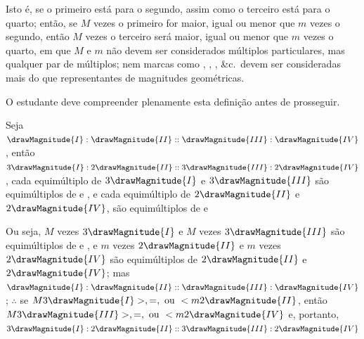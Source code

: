 \documentclass[booklanguage=brazilian]{byrnebook}
\begin{document}
Isto é, se o primeiro está para o segundo, assim como o terceiro está para o quarto; então, se $M$ vezes o primeiro for maior, igual ou menor que $m$ vezes o segundo, então $M$ vezes o terceiro será maior, igual ou menor que $m$ vezes o quarto, em que $M$ e $m$ não devem ser considerados múltiplos particulares, mas qualquer par de múltiplos; nem marcas como , , , \&c.\ devem ser consideradas mais do que representantes de magnitudes geométricas.

O estudante deve compreender plenamente esta definição antes de prosseguir.

\vfill\pagebreak

\label{prop:V.IV}

Seja $\drawMagnitude{I} : \drawMagnitude{II} :: \drawMagnitude{III} : \drawMagnitude{IV}$, então $3\drawMagnitude{I} : 2\drawMagnitude{II} :: 3\drawMagnitude{III} : 2\drawMagnitude{IV}$, cada equimúltiplo de $3\drawMagnitude{I}$ e $3\drawMagnitude{III}$ são equimúltiplos de  e , e cada equimúltiplo de $2\drawMagnitude{II}$ e $2\drawMagnitude{IV}$, são equimúltiplos de  e  

Ou seja, $M$ vezes $3\drawMagnitude{I}$ e $M$ vezes $3\drawMagnitude{III}$ são equimúltiplos de  e , e $m$ vezes $2\drawMagnitude{II}$ e $m$ vezes $2\drawMagnitude{IV}$ são equimúltiplos de $2\drawMagnitude{II}$ e $2\drawMagnitude{IV}$; mas $\drawMagnitude{I} : \drawMagnitude{II} :: \drawMagnitude{III} : \drawMagnitude{IV}$ \byref{\hypref}; $\therefore$ se $M 3\drawMagnitude{I} >, =, \mbox{ ou } < m 2 \drawMagnitude{II}$, então $M 3\drawMagnitude{III} >, =, \mbox{ ou } < m 2 \drawMagnitude{IV}$  e, portanto, $3\drawMagnitude{I} : 2\drawMagnitude{II} :: 3\drawMagnitude{III} : 2\drawMagnitude{IV}$ 
\end{document}
